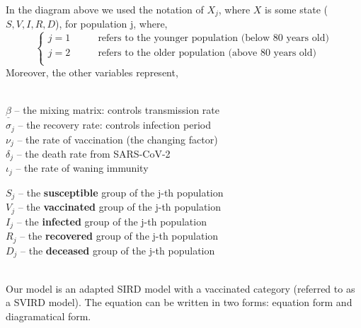 \documentclass{article}
\begin{document}
\noindent
In the diagram above we used the notation of $X_j$, where $X$ is some state ($S,V,I,R,D$), for population j, where,
$$\begin{cases} 
j=1 & \qquad\text{refers to the younger population (below 80 years old)} \\
j=2 & \qquad\text{refers to the older population (above 80 years old)} \\
\end{cases}
$$
Moreover, the other variables represent,\\\\
\noindent\begin{minipage}{.5\linewidth}
$\underline{\beta}$ -- the mixing matrix: controls transmission rate\\
$\sigma_{j}$ -- the recovery rate: controls infection period\\
$\nu_j$ -- the rate of vaccination (the changing factor)\\
$\delta_j$ -- the death rate from SARS-CoV-2\\
$\iota_j$ -- the rate of waning immunity\\
\end{minipage}%
\begin{minipage}{.5\linewidth}
$S_{j}$ -- the \textbf{susceptible} group of the j-th population\\
$V_{j}$ -- the \textbf{vaccinated} group of the j-th population\\
$I_{j}$ -- the \textbf{infected} group of the j-th population\\
$R_{j}$ -- the \textbf{recovered} group of the j-th population\\
$D_{j}$ -- the \textbf{deceased} group of the j-th population\\
\end{minipage}
\\
\noindent
Our model is an adapted SIRD model with a vaccinated category (referred to as a SVIRD model). The equation can be written in two forms: equation form and diagramatical form.
\end{document}
